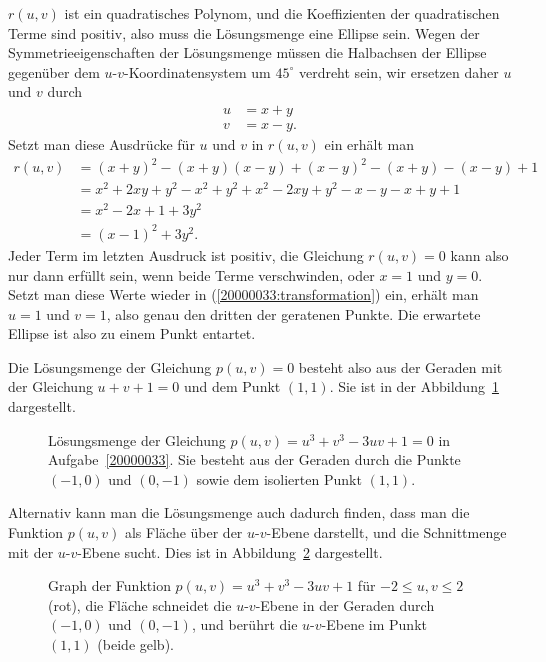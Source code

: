 \begin{diskussion}
$r(u,v)$ ist ein quadratisches Polynom, und die Koeffizienten der quadratischen
Terme sind positiv, also muss die Lösungsmenge eine Ellipse sein.
Wegen der Symmetrieeigenschaften der Lösungsmenge müssen die Halbachsen der 
Ellipse gegenüber dem $u$-$v$-Koordinatensystem um $45^\circ$ verdreht sein,
wir ersetzen daher $u$ und $v$ durch
\begin{equation}
\begin{aligned}
u&=x+y
\\
v&=x-y.
\end{aligned}
\label{20000033:transformation}
\end{equation}
Setzt man diese Ausdrücke für $u$ und $v$ in $r(u,v)$ ein erhält man
\begin{align*}
r(u,v)
&=(x+y)^2-(x+y)(x-y)+(x-y)^2-(x+y)-(x-y)+1\\
&=x^2+2xy+y^2-x^2+y^2+x^2-2xy+y^2-x-y-x+y+1\\
&=x^2-2x+1+3y^2\\
&=(x-1)^2+3y^2.
\end{align*}
Jeder Term im letzten Ausdruck ist positiv, die Gleichung $r(u,v)=0$ kann
also nur dann erfüllt sein, wenn beide Terme verschwinden, oder $x=1$ und $y=0$.
Setzt man diese Werte wieder in (\ref{20000033:transformation}) ein,
erhält man $u=1$ und $v=1$, also genau den dritten der geratenen Punkte.
Die erwartete Ellipse ist also zu einem Punkt entartet.

Die Lösungsmenge der Gleichung $p(u,v)=0$ besteht also aus der Geraden
mit der Gleichung $u+v+1=0$ und dem Punkt $(1,1)$.
Sie ist in der Abbildung~\ref{20000033:loesungsmenge} dargestellt.
\begin{figure}
\centering
{}
\caption{Lösungsmenge der Gleichung $p(u,v) = u^3+v^3-3uv+1=0$
in Aufgabe~\ref{20000033}. Sie besteht aus der Geraden durch die
Punkte $(-1,0)$ und $(0,-1)$ sowie dem isolierten Punkt $(1,1)$.
\label{20000033:loesungsmenge}}
\end{figure}

Alternativ kann man die Lösungsmenge auch dadurch finden, dass man die
Funktion $p(u,v)$ als Fläche über der $u$-$v$-Ebene darstellt, und die
Schnittmenge mit der $u$-$v$-Ebene sucht.
Dies  ist in Abbildung~\ref{20000033:flaeche} dargestellt.
\begin{figure}
\centering
{}
\caption{Graph der Funktion $p(u,v)=u^3+v^3-3uv+1$ für $-2\le u,v\le 2$ (rot),
die Fläche schneidet die $u$-$v$-Ebene in der Geraden durch $(-1,0)$ und
$(0,-1)$, und berührt die $u$-$v$-Ebene im Punkt $(1,1)$ (beide gelb).
\label{20000033:flaeche}}
\end{figure}
\end{diskussion}

